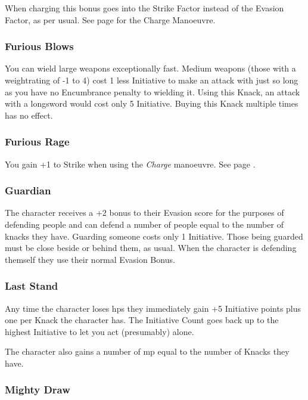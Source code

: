 \begin{multicols}{2}
When charging this bonus goes into the Strike Factor instead of the Evasion Factor, as per usual.
See page \pageref{charge} for the Charge Manoeuvre.

\subsubsection{Furious Blows}\label{furiousblows}

You can wield large weapons exceptionally fast.
Medium weapons (those with a \gls{weightrating} of -1 to 4) cost 1 less Initiative to make an attack with just so long as you have no Encumbrance penalty to wielding it.
Using this Knack, an attack with a longsword would cost only 5 Initiative.
Buying this Knack multiple times has no effect.

\subsubsection{Furious Rage}

You gain +1 to Strike when using the \textit{Charge} manoeuvre.
See page \pageref{charge}.

\subsubsection{Guardian}

The character receives a +2 bonus to their Evasion score for the purposes of defending people and can defend a number of people equal to the number of knacks they have.
Guarding someone costs only 1 Initiative.
Those being guarded must be close beside or behind them, as usual.
When the character is defending themself they use their normal Evasion Bonus.

\subsubsection{Last Stand}

Any time the character loses \glspl{hp} they immediately gain +5 Initiative points plus one per Knack the character has.
The Initiative Count goes back up to the highest Initiative to let you act (presumably) alone.

The character also gains a number of \gls{mp} equal to the number of Knacks they have.

\subsubsection{Mighty Draw}


\end{multicols}
